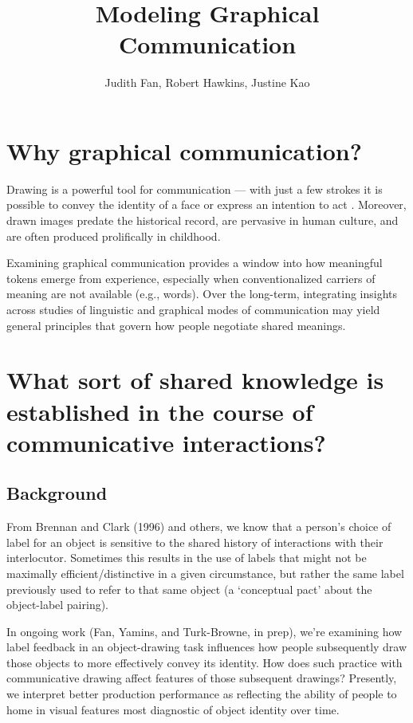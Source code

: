 \documentclass[12pt]{article}
\title{\textbf{Modeling Graphical Communication}}
\author{Judith Fan, Robert Hawkins, Justine Kao}
\begin{document}
\maketitle %

\section{Why graphical communication?}

Drawing is a powerful tool for communication --- with just a few strokes it is possible to convey the identity of a face \cite{bergmann2013impact}or express an intention to act \cite{Galantucci:2005uh}. Moreover, drawn images predate the historical record, are pervasive in human culture, and are often produced prolifically in childhood. 

Examining graphical communication provides a window into how meaningful tokens emerge from experience, especially when conventionalized carriers of meaning are not available (e.g., words). Over the long-term, integrating insights across studies of linguistic and graphical modes of communication may yield general principles that govern how people negotiate shared meanings.  

\section{What sort of shared knowledge is established in the course of communicative interactions?}

\subsection{Background}

From Brennan and Clark (1996) and others, we know that a person’s choice of label for an object is sensitive to the shared history of interactions with their interlocutor. Sometimes this results in the use of labels that might not be maximally efficient/distinctive in a given circumstance, but rather the same label previously used to refer to that same object (a ‘conceptual pact’ about the object-label pairing). 

In ongoing work (Fan, Yamins, and Turk-Browne, in prep), we’re examining how label feedback in an object-drawing task influences how people subsequently draw those objects to more effectively convey its identity. How does such practice with communicative drawing affect features of those subsequent drawings? Presently, we interpret better production performance as reflecting the ability of people to home in visual features most diagnostic of object identity over time. 
\end{document}
